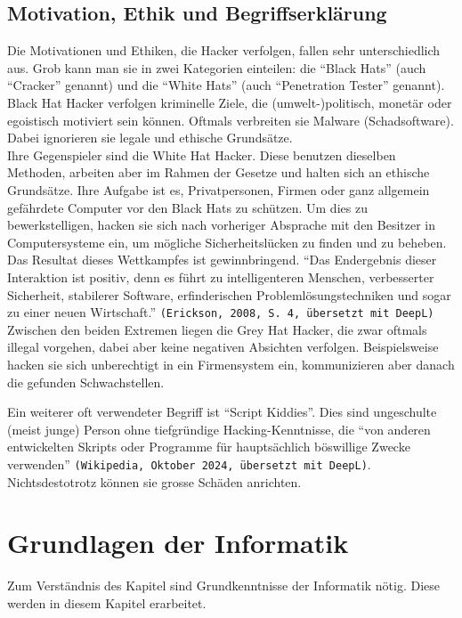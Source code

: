 \documentclass[11pt, a4paper]{article}
\begin{document}
\subsection{Motivation, Ethik und Begriffserklärung}
Die Motivationen und Ethiken, die Hacker verfolgen, fallen sehr unterschiedlich aus. Grob kann man sie in zwei Kategorien einteilen: die ``Black Hats'' (auch ``Cracker'' genannt) und die ``White Hats'' (auch ``Penetration Tester'' genannt). \\Black Hat Hacker verfolgen kriminelle Ziele, die (umwelt-)politisch, monetär oder egoistisch motiviert sein können. Oftmals verbreiten sie Malware (Schadsoftware). Dabei ignorieren sie legale und ethische Grundsätze. \\Ihre Gegenspieler sind die White Hat Hacker. Diese benutzen dieselben Methoden, arbeiten aber im Rahmen der Gesetze und halten sich an ethische Grundsätze. Ihre Aufgabe ist es, Privatpersonen, Firmen oder ganz allgemein gefährdete Computer vor den Black Hats zu schützen. Um dies zu bewerkstelligen, hacken sie sich nach vorheriger Absprache mit den Besitzer in Computersysteme ein, um mögliche Sicherheitslücken zu finden und zu beheben. \\ Das Resultat dieses Wettkampfes ist  gewinnbringend. ``Das Endergebnis dieser Interaktion ist positiv, denn es führt zu intelligenteren Menschen, verbesserter Sicherheit, stabilerer Software, erfinderischen Problemlösungstechniken und sogar zu einer neuen Wirtschaft.'' \texttt{(Erickson, 2008, S. 4, übersetzt mit DeepL)} \cite{erickson2008hacking}\\Zwischen den beiden Extremen liegen die Grey Hat Hacker, die zwar oftmals illegal vorgehen, dabei aber keine negativen Absichten verfolgen. Beispielsweise hacken sie sich unberechtigt in ein Firmensystem ein, kommunizieren aber danach die gefunden Schwachstellen. \cite{WhiteHatBlackHat:paper, BlackHat34:online}

Ein weiterer oft verwendeter Begriff ist ``Script Kiddies''. Dies sind ungeschulte (meist junge) Person ohne tiefgründige Hacking-Kenntnisse, die ``von anderen entwickelten Skripts oder Programme für hauptsächlich böswillige Zwecke verwenden'' \texttt{(Wikipedia, Oktober 2024, übersetzt mit DeepL)}. Nichtsdestotrotz können sie grosse Schäden anrichten. \cite{ScriptkiWikipedia:online}

\newpage
\section{Grundlagen der Informatik}
Zum Verständnis des Kapitel  sind Grundkenntnisse der Informatik nötig. Diese werden in diesem Kapitel erarbeitet. 
\end{document}
